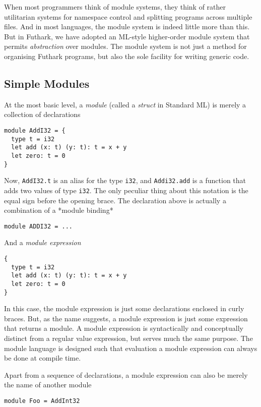 \documentclass[oneside,11pt]{book}
\begin{document}
When most programmers think of module systems, they think of rather
utilitarian systems for namespace control and splitting programs
across multiple files.  And in most languages, the module system is
indeed little more than this.  But in Futhark, we have adopted an
ML-style higher-order module system that permits \textit{abstraction}
over modules.  The module system is not just a method for organising
Futhark programs, but also the sole facility for writing generic code.

\subsection{Simple Modules}

At the most basic level, a \textit{module} (called a \textit{struct}
in Standard ML) is merely a collection of declarations

\begin{lstlisting}
module AddI32 = {
  type t = i32
  let add (x: t) (y: t): t = x + y
  let zero: t = 0
}
\end{lstlisting}

Now, \texttt{AddI32.t} is an alias for the type \texttt{i32}, and
\texttt{Addi32.add} is a function that adds two values of type
\texttt{i32}.  The only peculiar thing about this notation is the
equal sign before the opening brace.  The declaration above is
actually a combination of a *module binding*

\begin{lstlisting}
module ADDI32 = ...
\end{lstlisting}

And a \textit{module expression}

\begin{lstlisting}
{
  type t = i32
  let add (x: t) (y: t): t = x + y
  let zero: t = 0
}
\end{lstlisting}

In this case, the module expression is just some declarations enclosed
in curly braces.  But, as the name suggests, a module expression is
just some expression that returns a module.  A module expression is
syntactically and conceptually distinct from a regular value
expression, but serves much the same purpose.  The module language is
designed such that evaluation a module expression can always be done
at compile time.

Apart from a sequence of declarations, a module expression can also be
merely the name of another module

\begin{lstlisting}
module Foo = AddInt32
\end{lstlisting}
\end{document}
